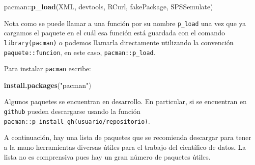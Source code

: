 \documentclass[]{article}
\newenvironment{Shaded}{\begin{snugshade}}{\end{snugshade}}
\newcommand{\KeywordTok}[1]{\textcolor[rgb]{0.13,0.29,0.53}{\textbf{{#1}}}}
\newcommand{\StringTok}[1]{\textcolor[rgb]{0.31,0.60,0.02}{{#1}}}
\newcommand{\NormalTok}[1]{{#1}}
\begin{document}
\begin{Shaded}
\begin{Highlighting}[]
\NormalTok{pacman::}\KeywordTok{p_load}\NormalTok{(XML, devtools, RCurl, fakePackage, SPSSemulate)}
\end{Highlighting}
\end{Shaded}

\begin{curiosidad}
Nota como se puede llamar a una función por su nombre \texttt{p\_load} una vez que 
ya cargamos el paquete en el cuál esa función está guardada con el comando \texttt{library(pacman)}
o podemos llamarla directamente utilizando la convención \texttt{paquete::funcion}, en este caso,
\texttt{pacman::p\_load}.
\end{curiosidad}

Para instalar \texttt{pacman} escribe:

\begin{Shaded}
\begin{Highlighting}[]
\KeywordTok{install.packages}\NormalTok{(}\StringTok{"pacman"}\NormalTok{)}
\end{Highlighting}
\end{Shaded}

Algunos paquetes se encuentran en desarrollo. En particular, si se
encuentran en \texttt{github} pueden descargarse usando la función
\texttt{pacman::p\_install\_gh(\textquotesingle{}usuario/repositorio\textquotesingle{})}.

A continuación, hay una lista de paquetes que se recomienda descargar
para tener a la mano herramientas diversas útiles para el trabajo del
científico de datos. La lista no es comprensiva pues hay un gran número
de paquetes útiles.
\end{document}

